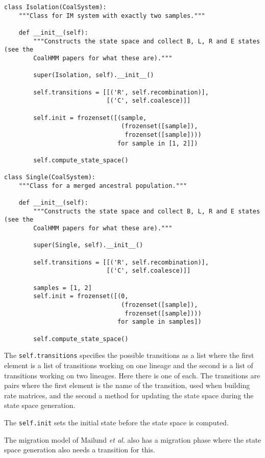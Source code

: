 \documentclass[11pt]{article}
\begin{document}
\begin{verbatim}
class Isolation(CoalSystem):
    """Class for IM system with exactly two samples."""

    def __init__(self):
        """Constructs the state space and collect B, L, R and E states (see the
        CoalHMM papers for what these are)."""

        super(Isolation, self).__init__()

        self.transitions = [[('R', self.recombination)],
                            [('C', self.coalesce)]]

        self.init = frozenset([(sample,
                                (frozenset([sample]),
                                 frozenset([sample])))
                               for sample in [1, 2]])

        self.compute_state_space()
        
class Single(CoalSystem):
    """Class for a merged ancestral population."""

    def __init__(self):
        """Constructs the state space and collect B, L, R and E states (see the
        CoalHMM papers for what these are)."""

        super(Single, self).__init__()

        self.transitions = [[('R', self.recombination)],
                            [('C', self.coalesce)]]

        samples = [1, 2]
        self.init = frozenset([(0,
                                (frozenset([sample]),
                                 frozenset([sample])))
                               for sample in samples])

        self.compute_state_space()
\end{verbatim}

The \texttt{self.transitions} specifies the possible transitions as a list where the first element is a list of transitions working on one lineage and the second is a list of transitions working on two lineages. Here there is one of each. The transitions are pairs where the first element is the name of the transition, used when building rate matrices, and the second a method for updating the state space during the state space generation.

The \texttt{self.init} sets the initial state before the state space is computed.

The migration model of Mailund \emph{et al.} \cite{Mailund:2012ew} also has a migration phase where the state space generation also needs a transition for this.
\end{document}
